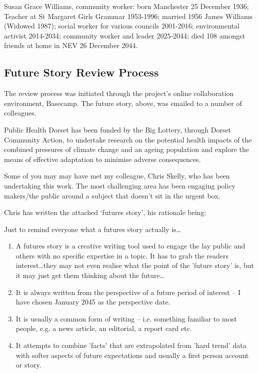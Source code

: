 Susan Grace Williams, community worker: born Manchester 25 December 1936; Teacher at St Margaret Girls Grammar 1953-1996; married 1956 James Williams (Widowed 1987); social worker for various councils 2001-2016; environmental activist 2014-2034; community worker and leader 2025-2044; died 108 amongst friends at home in NEV 26 December 2044.

\subsection{Future Story Review Process}
The review process was initiated through the project's online collaboration environment, Basecamp. The future story, above, was emailed to a number of colleagues.

Public Health Dorset has been funded by the Big Lottery, through Dorset Community Action, to undertake research on the potential health impacts of the combined pressures of climate change and an ageing population and explore the means of effective adaptation to minimise adverse consequences.

Some of you may may have met my colleague, Chris Skelly, who has been undertaking this work.  The most challenging area has been engaging policy makers/the public around a subject that doesn't sit in the urgent box.

Chris has written the attached `futures story', his rationale being:

Just to remind everyone what a futures story actually is\ldots

\begin{enumerate}
	\item A futures story is a creative writing tool used to engage the lay public and others with no specific expertise in a topic. It has to grab the readers interest\ldots they may not even realise what the point of the 'future story' is, but it may just get them thinking about the future\ldots
	\item It is always written from the perspective of a future period of interest -- I have chosen January 2045 as the perspective date.
	\item It is usually a common form of writing -- i.e. something familiar to most people, e.g. a news article, an editorial, a report card etc.
	\item It attempts to combine 'facts' that are extrapolated from 'hard trend' data with softer aspects of future expectations and usually a first person account or story.
\end{enumerate}

